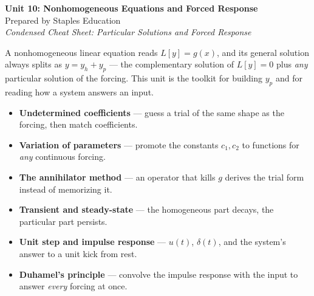 




\begin{center}
    {\LARGE \bfseries Unit 10: Nonhomogeneous Equations and Forced Response}\\[6pt]
    {\large Prepared by Staples Education}\\[4pt]
    {\itshape Condensed Cheat Sheet: Particular Solutions and Forced Response}
\end{center}

\vspace{0.4em}

\begin{topicsbox}
A nonhomogeneous linear equation reads $L[y] = g(x)$, and its general solution
always splits as $y = y_h + y_p$ --- the complementary solution of $L[y]=0$ plus
\emph{any} particular solution of the forcing. This unit is the toolkit for
building $y_p$ and for reading how a system answers an input.
\begin{itemize}[leftmargin=1.4em, itemsep=3pt]
    \item \textbf{Undetermined coefficients} --- guess a trial of the same shape as
          the forcing, then match coefficients.
    \item \textbf{Variation of parameters} --- promote the constants $c_1,c_2$ to
          functions for \emph{any} continuous forcing.
    \item \textbf{The annihilator method} --- an operator that kills $g$ derives
          the trial form instead of memorizing it.
    \item \textbf{Transient and steady-state} --- the homogeneous part decays, the
          particular part persists.
    \item \textbf{Unit step and impulse response} --- $u(t)$, $\delta(t)$, and the
          system's answer to a unit kick from rest.
    \item \textbf{Duhamel's principle} --- convolve the impulse response with the
          input to answer \emph{every} forcing at once.
\end{itemize}
\end{topicsbox}

